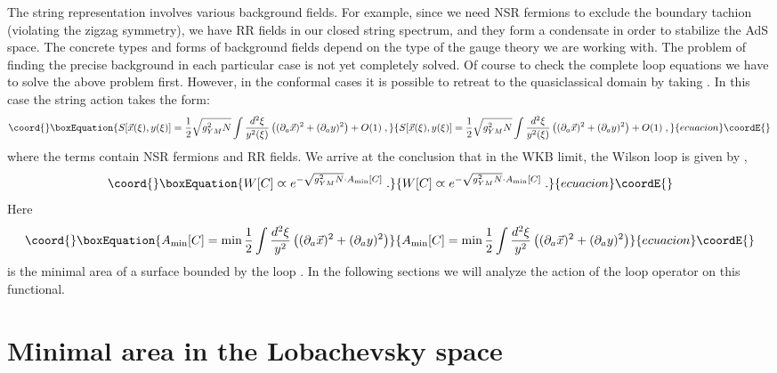 \documentclass[a4paper,12pt]{article}
\numberwithin{equation}{section}
\begin{document}
The string representation involves various background fields. For example, since
we need NSR fermions to exclude the boundary tachion (violating the zigzag symmetry),
we have RR fields in our closed string spectrum, and they form a condensate
in order to stabilize the AdS space. The concrete types and forms of background
fields depend on the type of the gauge theory we are working with. The problem
of finding the precise background in each particular case is not yet completely
solved. Of course to check the complete loop equations we have to solve the
above problem first. However, in the conformal cases it is possible to retreat
to the quasiclassical domain by taking \coordHE{}. In this case
the string action takes the form:
\begin{equation}\coord{}\boxEquation{
\label{3.8}
S[\vec{x}(\xi ),y(\xi )]=\frac{1}{2}\sqrt{g_{YM}^{2}N}\int \frac{d^{2}\xi }{y^{2}(\xi )}\left( (\partial _{a}\vec{x})^{2}+(\partial _{a}y)^{2}\right) +O(1)\; ,
}{
S[\vec{x}(\xi ),y(\xi )]=\frac{1}{2}\sqrt{g_{YM}^{2}N}\int \frac{d^{2}\xi }{y^{2}(\xi )}\left( (\partial _{a}\vec{x})^{2}+(\partial _{a}y)^{2}\right) +O(1)\; ,
}{ecuacion}\coordE{}\end{equation}
 where the terms \coordHE{} contain NSR fermions and RR fields. We arrive at
the conclusion that in the WKB limit, the Wilson loop is given by \cite{13},\emph{\,}\cite{14}
\begin{equation}\coord{}\boxEquation{
\label{3.75}
W[C]\varpropto e^{-\sqrt{g_{YM}^{2}N}\cdot A_{\min }[C]}\; .
}{
W[C]\varpropto e^{-\sqrt{g_{YM}^{2}N}\cdot A_{\min }[C]}\; .
}{ecuacion}\coordE{}\end{equation}
 Here
\begin{equation}\coord{}\boxEquation{
\label{3.9}
A_{\min }[C]=\min \frac{1}{2}\int \frac{d^{2}\xi }{y^{2}}\left( (\partial _{a}\vec{x})^{2}+(\partial _{a}y)^{2}\right) 
}{
A_{\min }[C]=\min \frac{1}{2}\int \frac{d^{2}\xi }{y^{2}}\left( (\partial _{a}\vec{x})^{2}+(\partial _{a}y)^{2}\right) 
}{ecuacion}\coordE{}\end{equation}
 is the minimal area of a surface bounded by the loop \coordHE{}. In the following
sections we will analyze the action of the loop operator on this functional.


\section{Minimal area in the Lobachevsky space}
\end{document}
